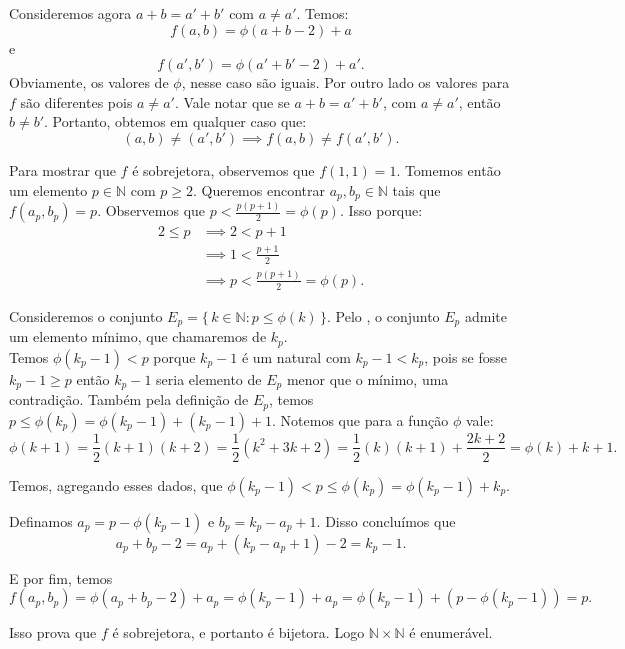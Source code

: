 \documentclass[../main.tex]{subfiles}
\begin{document}
\begin{dem}
    \noindent
    Consideremos agora $a+b = a'+b'$ com $a \neq a'$. Temos:
    \[ f(a,b) = \phi(a+b-2) + a \]
    e
    \[ f(a',b') = \phi(a'+b'-2) + a'. \]
    Obviamente, os valores de $\phi$, nesse caso são iguais. Por outro lado os valores para $f$ são diferentes pois $a \neq a'$.
    Vale notar que se $a+b = a'+b'$, com $a \neq a'$, então $b \neq b'$. 
    Portanto, obtemos em qualquer caso que:
    \[ (a,b) \neq (a',b') \implies f(a,b) \neq f(a',b'). \]

    Para mostrar que $f$ é sobrejetora, observemos que $f(1,1) = 1$. Tomemos então um elemento $p \in \mathbb{N}$ com 
    $p \geq 2$. Queremos encontrar $a_p, b_p \in \mathbb{N}$ tais que $f(a_p,b_p) = p$.
    Observemos que $p < \frac{p(p+1)}{2} = \phi(p)$. Isso porque:
    \begin{align*}
        2 \leq p &\implies 2 < p+1 \\
        & \implies 1 < \frac{p+1}{2} \\
        & \implies p < \frac{p(p+1)}{2} =\phi(p). 
    \end{align*}
    
    Consideremos o conjunto $E_p = \{\,k \in \mathbb{N} : p \leq \phi(k) \,\}$.
    Pelo , o conjunto $E_p$ admite um elemento mínimo, que chamaremos de $k_p$. \\
    Temos $\phi(k_p - 1) < p$ porque $k_p - 1$ é um natural com $k_p - 1 < k_p$, pois se fosse $k_p - 1 \geq p$ então $k_p - 1$ seria elemento de $E_p$ menor que o mínimo, uma contradição.
    Também pela definição de $E_p$, temos $p \leq \phi(k_p) = \phi(k_p - 1) + (k_p - 1)+1$. Notemos que para a função $\phi$ vale:
    \[ \phi(k+1) = \frac{1}{2}(k+1)(k+2) = \frac{1}{2}(k^2 + 3k + 2) = \frac{1}{2}(k)(k+1)+\frac{2k+2}{2} = \phi(k) + k+1. \]
    
    Temos, agregando esses dados, que $\phi(k_p - 1) < p \leq \phi(k_p) = \phi(k_p-1) + k_p$.
    
    Definamos $a_p = p - \phi(k_p-1)$ e $b_p = k_p - a_p + 1$. Disso concluímos que 
    \[ a_p + b_p - 2 = a_p + (k_p - a_p + 1) - 2 = k_p - 1. \]
    
    E por fim, temos
    \[f(a_p,b_p) = \phi(a_p+b_p-2) + a_p = \phi(k_p-1) + a_p  = \phi(k_p - 1) + (p - \phi(k_p-1))= p .\]
    
    Isso prova que $f$ é sobrejetora, e portanto é bijetora. Logo $\mathbb{N} \times \mathbb{N}$ é enumerável. 
\end{dem}
\end{document}

